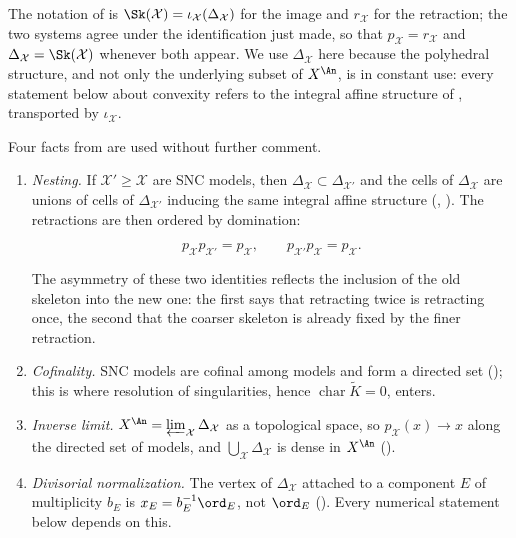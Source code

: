 The notation of  is
\(\Sk(\mathcal X)=\iota_{\mathcal X}(\Delta_{\mathcal X})\) for the image
and \(r_{\mathcal X}\) for the retraction; the two systems agree under the
identification just made, so that \(p_{\mathcal X}=r_{\mathcal X}\) and
\(\Delta_{\mathcal X}=\Sk(\mathcal X)\) whenever both appear.  We use
\(\Delta_{\mathcal X}\) here because the polyhedral structure, and not only
the underlying subset of \(X^{\An}\), is in constant use: every statement
below about convexity refers to the integral affine structure of
, transported by \(\iota_{\mathcal X}\).

Four facts from  are used without further comment.

\begin{enumerate}
\item \emph{Nesting.}  If \(\mathcal X'\geq\mathcal X\) are SNC models, then
\(\Delta_{\mathcal X}\subset\Delta_{\mathcal X'}\) and the cells of
\(\Delta_{\mathcal X}\) are unions of cells of \(\Delta_{\mathcal X'}\)
inducing the same integral affine structure
(, ).
The retractions are then ordered by domination:

\begin{equation}
\label{eq:ch21-retraction-composition}
 p_{\mathcal X}p_{\mathcal X'}=p_{\mathcal X},
 \qquad
 p_{\mathcal X'}p_{\mathcal X}=p_{\mathcal X}.
\end{equation}

The asymmetry of these two identities reflects the inclusion of the old
skeleton into the new one: the first says that retracting twice is
retracting once, the second that the coarser skeleton is already fixed by
the finer retraction.
\item \emph{Cofinality.}  SNC models are cofinal among models and form a
directed set (); this is where resolution of
singularities, hence \(\operatorname{char}\widetilde K=0\), enters.
\item \emph{Inverse limit.}  \(X^{\An}=\varprojlim_{\mathcal X}
\Delta_{\mathcal X}\) as a topological space, so
\(p_{\mathcal X}(x)\to x\) along the directed set of models, and
\(\bigcup_{\mathcal X}\Delta_{\mathcal X}\) is dense in \(X^{\An}\)
().
\item \emph{Divisorial normalization.}  The vertex of
\(\Delta_{\mathcal X}\) attached to a component \(E\) of multiplicity
\(b_E\) is \(x_E=b_E^{-1}\ord_E\), not \(\ord_E\)
().  Every numerical statement below
depends on this.
\end{enumerate}

